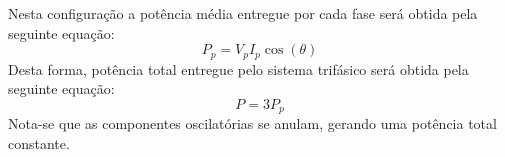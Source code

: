 \documentclass{article}
\begin{document}
        \begin{definition}
            Nesta configuração a potência média entregue por cada fase será obtida pela seguinte equação:
                \begin{equation}
                    \boxed{P_{p} = V_{p}I_{p}\cos(\theta)}
                \end{equation}
            Desta forma, potência total entregue pelo sistema trifásico será obtida pela seguinte equação:
                \begin{equation}
                    \boxed{P = 3P_{p}}
                \end{equation}
            Nota-se que as componentes oscilatórias se anulam, gerando uma potência total constante.
        \end{definition}
\newpage
\end{document}

